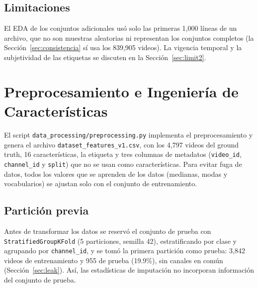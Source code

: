 \documentclass[conference]{IEEEtran}
\begin{document}
\subsection{Limitaciones}\label{sec:limit1}
El EDA de los conjuntos adicionales usó solo las primeras 1,000 líneas de un archivo, que no son muestras aleatorias ni representan los conjuntos completos (la Sección~\ref{sec:consistencia} sí usa los 839,905 videos). La vigencia temporal y la subjetividad de las etiquetas se discuten en la Sección~\ref{sec:limit2}.

\section{Preprocesamiento e Ingeniería de Características}\label{sec:prep}
El script \texttt{data\_processing/preprocessing.py} implementa el preprocesamiento y genera el archivo \texttt{dataset\_features\_v1.csv}, con los 4,797 videos del ground truth, 16 características, la etiqueta y tres columnas de metadatos (\texttt{video\_id}, \texttt{channel\_id} y \texttt{split}) que no se usan como características. Para evitar fuga de datos, todos los valores que se aprenden de los datos (medianas, modas y vocabularios) se ajustan solo con el conjunto de entrenamiento.

\subsection{Partición previa}
Antes de transformar los datos se reservó el conjunto de prueba con \texttt{StratifiedGroupKFold} (5 particiones, semilla 42), estratificando por clase y agrupando por \texttt{channel\_id}, y se tomó la primera partición como prueba: 3,842 videos de entrenamiento y 955 de prueba (19.9\%), sin canales en común (Sección~\ref{sec:leak}). Así, las estadísticas de imputación no incorporan información del conjunto de prueba.
\end{document}
